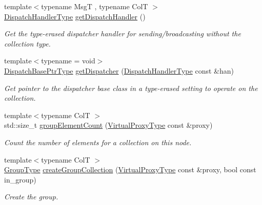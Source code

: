 \begin{DoxyCompactItemize}
{\footnotesize template$<$typename MsgT , typename ColT $>$ }\\\hyperlink{structvt_1_1vrt_1_1collection_1_1_collection_manager_a0cfe02a0426e95ec9daa2ef7374e07c7}{Dispatch\+Handler\+Type} \hyperlink{structvt_1_1vrt_1_1collection_1_1_collection_manager_ab672ad6c3bc9fdc5a9577a9ae0677d1f}{get\+Dispatch\+Handler} ()
\begin{DoxyCompactList}\small\item\em Get the type-\/erased dispatcher handler for sending/broadcasting without the collection type. \end{DoxyCompactList}\item 
{\footnotesize template$<$typename  = void$>$ }\\\hyperlink{namespacevt_1_1vrt_1_1collection_aa3b9731ae16d60fac43d68840f3606a5}{Dispatch\+Base\+Ptr\+Type} \hyperlink{structvt_1_1vrt_1_1collection_1_1_collection_manager_af183a018e0d2d8b3ed024244d8f83f45}{get\+Dispatcher} (\hyperlink{structvt_1_1vrt_1_1collection_1_1_collection_manager_a0cfe02a0426e95ec9daa2ef7374e07c7}{Dispatch\+Handler\+Type} const \&han)
\begin{DoxyCompactList}\small\item\em Get pointer to the dispatcher base class in a type-\/erased setting to operate on the collection. \end{DoxyCompactList}\item 
{\footnotesize template$<$typename ColT $>$ }\\std\+::size\+\_\+t \hyperlink{structvt_1_1vrt_1_1collection_1_1_collection_manager_a79fb70bedfb02bc57ae4280345dd9427}{group\+Element\+Count} (\hyperlink{namespacevt_a1b417dd5d684f045bb58a0ede70045ac}{Virtual\+Proxy\+Type} const \&proxy)
\begin{DoxyCompactList}\small\item\em Count the number of elements for a collection on this node. \end{DoxyCompactList}\item 
{\footnotesize template$<$typename ColT $>$ }\\\hyperlink{namespacevt_a27b5e4411c9b6140c49100e050e2f743}{Group\+Type} \hyperlink{structvt_1_1vrt_1_1collection_1_1_collection_manager_a7ac57a8d33e619cbb036c02f15b2b3db}{create\+Group\+Collection} (\hyperlink{namespacevt_a1b417dd5d684f045bb58a0ede70045ac}{Virtual\+Proxy\+Type} const \&proxy, bool const in\+\_\+group)
\begin{DoxyCompactList}\small\item\em Create the group. \end{DoxyCompactList}\item 

\end{DoxyCompactItemize}

